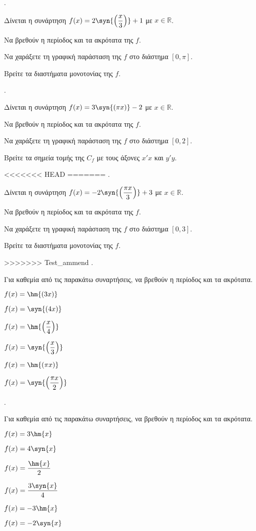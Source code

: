 \documentclass[11pt,a4paper,twocolumn]{article}
\newcounter{askhsh}
\newcommand{\askhsh}{\large\theaskhsh.\ \addtocounter{askhsh}{1}}
\begin{document}
\askhsh Δίνεται η συνάρτηση $f(x)=2\syn{\left(\dfrac{x}{3}\right)}+1$ με $x\in\mathbb{R}$.
\begin{alist}
\item Να βρεθούν η περίοδος και τα ακρότατα της $f$.
\item Να χαράξετε τη γραφική παράσταση της $f$ στο διάστημα $[0,\pi]$.
\item Βρείτε τα διαστήματα μονοτονίας της $f$.
\end{alist}
\askhsh Δίνεται η συνάρτηση $f(x)=3\syn{\left(\pi x\right)}-2$ με $x\in\mathbb{R}$.
\begin{alist}
\item Να βρεθούν η περίοδος και τα ακρότατα της $f$.
\item Να χαράξετε τη γραφική παράσταση της $f$ στο διάστημα $[0,2]$.
\item Βρείτε τα σημεία τομής της $C_f$ με τους άξονες $x'x$ και $y'y$.
\end{alist}
<<<<<<< HEAD
=======
\askhsh Δίνεται η συνάρτηση $f(x)=-2\syn{\left(\dfrac{\pi x}{3}\right)}+3$ με $x\in\mathbb{R}$.
\begin{alist}
\item Να βρεθούν η περίοδος και τα ακρότατα της $f$.
\item Να χαράξετε τη γραφική παράσταση της $f$ στο διάστημα $[0,3]$.
\item Βρείτε τα διαστήματα μονοτονίας της $f$.
\end{alist}
>>>>>>> Test_ammend
\askhsh Για καθεμία από τις παρακάτω συναρτήσεις, να βρεθούν η περίοδος και τα ακρότατα.
\begin{multicols}{2}
\begin{alist}
\item $f(x)=\hm{(3x)}$
\item $f(x)=\syn{(4x)}$
\item $f(x)=\hm{\left(\dfrac{x}{4}\right)}$
\item $f(x)=\syn{\left(\dfrac{x}{3}\right)}$
\item $f(x)=\hm{(\pi x)}$
\item $f(x)=\syn{\left(\dfrac{\pi x}{2}\right)}$
\end{alist}
\end{multicols}
\askhsh Για καθεμία από τις παρακάτω συναρτήσεις, να βρεθούν η περίοδος και τα ακρότατα.
\begin{multicols}{2}
\begin{alist}
\item $f(x)=3\hm{x}$
\item $f(x)=4\syn{x}$
\item $f(x)=\dfrac{\hm{x}}{2}$
\item $f(x)=\dfrac{3\syn{x}}{4}$
\item $f(x)=-3\hm{x}$
\item $f(x)=-2\syn{x}$
\end{alist}
\end{multicols}
\end{document}
